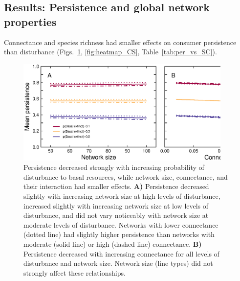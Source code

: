 \documentclass[12pt]{article}
\begin{document}
\begin{spacing}{2.0}
            

\section{Results: Persistence and global network properties}

    Connectance and species richness had smaller effects on consumer persistence than disturbance (Figs.~\ref{fig:lm_CS}, \ref{fig:heatmap_CS}, Table~\ref{tab:per_vs_SC}).


    \begin{figure}[h!]
        \centering
        \includegraphics[width=0.95\textwidth]{figures/persistence_vs_SC_lm.eps}
        \caption{Persistence decreased strongly with increasing probability of disturbance to basal resources, while network size, connectance, and their interaction had smaller effects. \textbf{A)} Persistence decreased slightly with increasing network size at high levels of disturbance, increased slightly with increasing network size at low levels of disturbance, and did not vary noticeably with network size at moderate levels of disturbance. Networks with lower connectance (dotted line) had slightly higher persistence than networks with moderate (solid line) or high (dashed line) connectance.
        \textbf{B)} Persistence decreased with increasing connectance for all levels of disturbance and network size. Network size (line types) did not strongly affect these relationships.}
        \label{fig:lm_CS}
    \end{figure}




\end{spacing}
\end{document}
